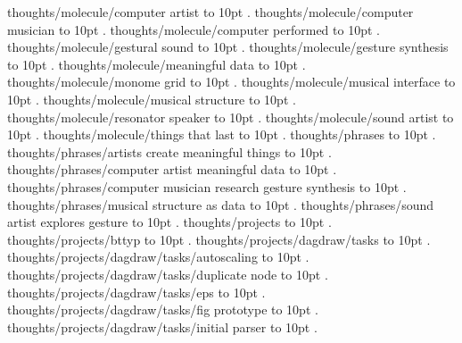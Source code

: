 \smallskip
thoughts/molecule/computer artist \leaders\hbox to 10pt {\hss.\hss}  \hfill {}
\smallskip
thoughts/molecule/computer musician \leaders\hbox to 10pt {\hss.\hss}  \hfill {}
\smallskip
thoughts/molecule/computer performed \leaders\hbox to 10pt {\hss.\hss}  \hfill {}
\smallskip
thoughts/molecule/gestural sound \leaders\hbox to 10pt {\hss.\hss}  \hfill {}
\smallskip
thoughts/molecule/gesture synthesis \leaders\hbox to 10pt {\hss.\hss}  \hfill {}
\smallskip
thoughts/molecule/meaningful data \leaders\hbox to 10pt {\hss.\hss}  \hfill {}
\smallskip
thoughts/molecule/monome grid \leaders\hbox to 10pt {\hss.\hss}  \hfill {}
\smallskip
thoughts/molecule/musical interface \leaders\hbox to 10pt {\hss.\hss}  \hfill {}
\smallskip
thoughts/molecule/musical structure \leaders\hbox to 10pt {\hss.\hss}  \hfill {}
\smallskip
thoughts/molecule/resonator speaker \leaders\hbox to 10pt {\hss.\hss}  \hfill {}
\smallskip
thoughts/molecule/sound artist \leaders\hbox to 10pt {\hss.\hss}  \hfill {}
\smallskip
thoughts/molecule/things that last \leaders\hbox to 10pt {\hss.\hss}  \hfill {}
\smallskip
thoughts/phrases \leaders\hbox to 10pt {\hss.\hss}  \hfill {}
\smallskip
thoughts/phrases/artists create meaningful things \leaders\hbox to 10pt {\hss.\hss}  \hfill {}
\smallskip
thoughts/phrases/computer artist meaningful data \leaders\hbox to 10pt {\hss.\hss}  \hfill {}
\smallskip
thoughts/phrases/computer musician research gesture synthesis \leaders\hbox to 10pt {\hss.\hss}  \hfill {}
\smallskip
thoughts/phrases/musical structure as data \leaders\hbox to 10pt {\hss.\hss}  \hfill {}
\smallskip
thoughts/phrases/sound artist explores gesture \leaders\hbox to 10pt {\hss.\hss}  \hfill {}
\smallskip
thoughts/projects \leaders\hbox to 10pt {\hss.\hss}  \hfill {}
\smallskip
thoughts/projects/bttyp \leaders\hbox to 10pt {\hss.\hss}  \hfill {}
\smallskip
thoughts/projects/dagdraw/tasks \leaders\hbox to 10pt {\hss.\hss}  \hfill {}
\smallskip
thoughts/projects/dagdraw/tasks/autoscaling \leaders\hbox to 10pt {\hss.\hss}  \hfill {}
\smallskip
thoughts/projects/dagdraw/tasks/duplicate node \leaders\hbox to 10pt {\hss.\hss}  \hfill {}
\smallskip
thoughts/projects/dagdraw/tasks/eps \leaders\hbox to 10pt {\hss.\hss}  \hfill {}
\smallskip
thoughts/projects/dagdraw/tasks/fig prototype \leaders\hbox to 10pt {\hss.\hss}  \hfill {}
\smallskip
thoughts/projects/dagdraw/tasks/initial parser \leaders\hbox to 10pt {\hss.\hss}  \hfill {}
